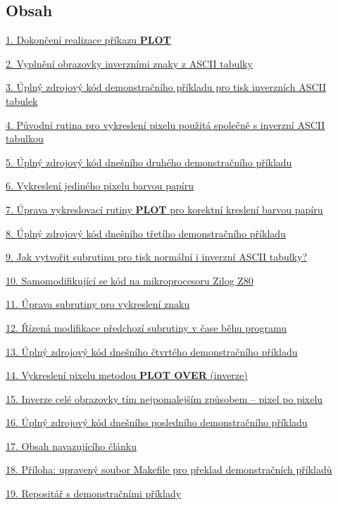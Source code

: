 \documentclass{article}
\begin{document}
\hypertarget{readability-page-1}{}
\hypertarget{h20}{%
\subsection{Obsah}\label{h20}}

\protect\hyperlink{k01}{1. Dokončení realizace příkazu \textbf{PLOT}}

\protect\hyperlink{k02}{2. Vyplnění obrazovky inverzními znaky z ASCII
tabulky}

\protect\hyperlink{k03}{3. Úplný zdrojový kód demonstračního příkladu
pro tisk inverzních ASCII tabulek}

\protect\hyperlink{k04}{4. Původní rutina pro vykreslení pixelu použitá
společně s inverzní ASCII tabulkou}

\protect\hyperlink{k05}{5. Úplný zdrojový kód dnešního druhého
demonstračního příkladu}

\protect\hyperlink{k06}{6. Vykreslení jediného pixelu barvou papíru}

\protect\hyperlink{k07}{7. Úprava vykreslovací rutiny \textbf{PLOT} pro
korektní kreslení barvou papíru}

\protect\hyperlink{k08}{8. Úplný zdrojový kód dnešního třetího
demonstračního příkladu}

\protect\hyperlink{k09}{9. Jak vytvořit subrutinu pro tisk normální i
inverzní ASCII tabulky?}

\protect\hyperlink{k10}{10. Samomodifikující se kód na mikroprocesoru
Zilog Z80}

\protect\hyperlink{k11}{11. Úprava subrutiny pro vykreslení znaku}

\protect\hyperlink{k12}{12. Řízená modifikace předchozí subrutiny v čase
běhu programu}

\protect\hyperlink{k13}{13. Úplný zdrojový kód dnešního čtvrtého
demonstračního příkladu}

\protect\hyperlink{k14}{14. Vykreslení pixelu metodou \textbf{PLOT OVER}
(inverze)}

\protect\hyperlink{k15}{15. Inverze celé obrazovky tím nejpomalejším
způsobem -- pixel po pixelu}

\protect\hyperlink{k16}{16. Úplný zdrojový kód dnešního posledního
demonstračního příkladu}

\protect\hyperlink{k17}{17. Obsah navazujícího článku}

\protect\hyperlink{k18}{18. Příloha: upravený soubor Makefile pro
překlad demonstračních příkladů}

\protect\hyperlink{k19}{19. Repositář s demonstračními příklady}
\end{document}
